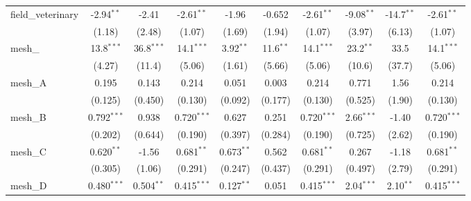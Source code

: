 \begin{tabular}{lccccccccc}
   field\_veterinary                                           & -2.94$^{**}$   & -2.41          & -2.61$^{**}$   & -1.96          & -0.652        & -2.61$^{**}$   & -9.08$^{**}$   & -14.7$^{**}$  & -2.61$^{**}$\\   
                                                               & (1.18)         & (2.48)         & (1.07)         & (1.69)         & (1.94)        & (1.07)         & (3.97)         & (6.13)        & (1.07)\\   
   mesh\_                                                      & 13.8$^{***}$   & 36.8$^{***}$   & 14.1$^{***}$   & 3.92$^{**}$    & 11.6$^{**}$   & 14.1$^{***}$   & 23.2$^{**}$    & 33.5          & 14.1$^{***}$\\   
                                                               & (4.27)         & (11.4)         & (5.06)         & (1.61)         & (5.66)        & (5.06)         & (10.6)         & (37.7)        & (5.06)\\   
   mesh\_A                                                     & 0.195          & 0.143          & 0.214          & 0.051          & 0.003         & 0.214          & 0.771          & 1.56          & 0.214\\   
                                                               & (0.125)        & (0.450)        & (0.130)        & (0.092)        & (0.177)       & (0.130)        & (0.525)        & (1.90)        & (0.130)\\   
   mesh\_B                                                     & 0.792$^{***}$  & 0.938          & 0.720$^{***}$  & 0.627          & 0.251         & 0.720$^{***}$  & 2.66$^{***}$   & -1.40         & 0.720$^{***}$\\   
                                                               & (0.202)        & (0.644)        & (0.190)        & (0.397)        & (0.284)       & (0.190)        & (0.725)        & (2.62)        & (0.190)\\   
   mesh\_C                                                     & 0.620$^{**}$   & -1.56          & 0.681$^{**}$   & 0.673$^{**}$   & 0.562         & 0.681$^{**}$   & 0.267          & -1.18         & 0.681$^{**}$\\   
                                                               & (0.305)        & (1.06)         & (0.291)        & (0.247)        & (0.437)       & (0.291)        & (0.497)        & (2.79)        & (0.291)\\   
   mesh\_D                                                     & 0.480$^{***}$  & 0.504$^{**}$   & 0.415$^{***}$  & 0.127$^{**}$   & 0.051         & 0.415$^{***}$  & 2.04$^{***}$   & 2.10$^{**}$   & 0.415$^{***}$\\   

\end{tabular}
